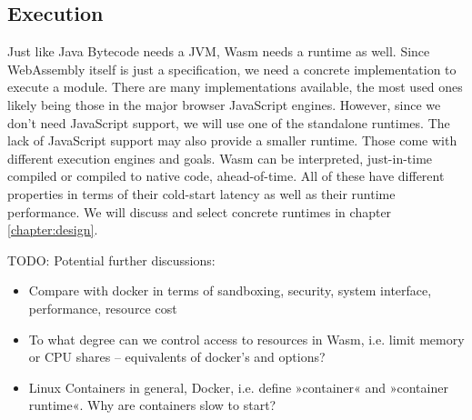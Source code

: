 \subsection{Execution}

Just like Java Bytecode needs a JVM, Wasm needs a runtime as well. Since WebAssembly itself is just a specification, we need a concrete implementation to execute a module. There are many implementations available, the most used ones likely being those in the major browser JavaScript engines. However, since we don't need JavaScript support, we will use one of the standalone runtimes. The lack of JavaScript support may also provide a smaller runtime. Those come with different execution engines and goals. Wasm can be interpreted, just-in-time compiled or compiled to native code, ahead-of-time. All of these have different properties in terms of their cold-start latency as well as their runtime performance. We will discuss and select concrete runtimes in chapter \ref{chapter:design}.

TODO: Potential further discussions:
\begin{itemize}
    \item Compare with docker in terms of sandboxing, security, system interface, performance, resource cost
    \item To what degree can we control access to resources in Wasm, i.e. limit memory or CPU shares -- equivalents of docker's  and  options?
    \item Linux Containers in general, Docker, i.e. define »container« and »container runtime«. Why are containers slow to start?
\end{itemize}